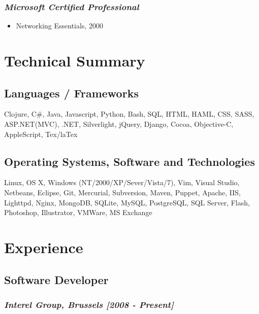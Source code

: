 \documentclass{article}
\begin{document}
\subsubsection*{\emph{Microsoft Certified Professional}}
\label{sec-1.2.1}

\begin{itemize}
\item Networking Essentials, 2000
\end{itemize}
\section*{Technical Summary}
\label{sec-2}

\subsection*{Languages / Frameworks}
\label{sec-2.1}

Clojure, C\#, Java, Javascript, Python, Bash, SQL, HTML, HAML, CSS, SASS, ASP.NET(MVC), .NET, Silverlight, jQuery, Django, Cocoa, Objective-C, AppleScript, Tex/laTex
\subsection*{Operating Systems, Software and Technologies}
\label{sec-2.2}

Linux, OS X, Windows (NT/2000/XP/Sever/Vista/7), Vim, Visual Studio, Netbeans, Eclipse, Git, Mercurial, Subversion, Maven, Puppet, Apache, IIS, Lighttpd, Nginx, MongoDB, SQLite, MySQL, PostgreSQL, SQL Server, Flash, Photoshop, Illustrator, VMWare, MS Exchange
\section*{Experience}
\label{sec-3}

\subsection*{Software Developer}
\label{sec-3.1}

\subsubsection*{\emph{Interel Group, Brussels  [2008 - Present]}}
\label{sec-3.1.1}
\end{document}
